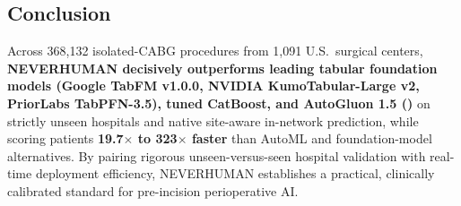 \subsection{Conclusion}
Across 368,132 isolated-CABG procedures from 1,091 U.S.\ surgical centers, \textbf{NEVERHUMAN decisively outperforms leading tabular foundation models (Google TabFM v1.0.0, NVIDIA KumoTabular-Large v2, PriorLabs TabPFN-3.5), tuned CatBoost, and AutoGluon 1.5 ()} on strictly unseen hospitals and native site-aware in-network prediction, while scoring patients \textbf{19.7$\times$ to 323$\times$ faster} than AutoML and foundation-model alternatives. By pairing rigorous unseen-versus-seen hospital validation with real-time deployment efficiency, NEVERHUMAN establishes a practical, clinically calibrated standard for pre-incision perioperative AI.
